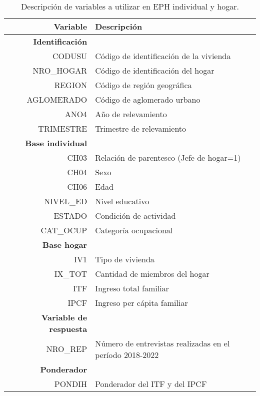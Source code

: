 \documentclass{article}
\begin{document}
\begin{table}
    \centering
\caption{Descripción de variables a utilizar en EPH individual y hogar.}

\

\label{tab:my_label}
    \begin{tabular}{|rl|} 
        \hline
        \textbf{Variable} & 
        \textbf{Descripción} \\ 
        \hline

        \textbf{Identificación}&\\
        CODUSU & Código de identificación de la vivienda\\
        NRO\_HOGAR & Código de identificación del hogar \\
        REGION&Código de región geográfica\\
        AGLOMERADO & Código de aglomerado urbano \\
        ANO4&Año de relevamiento\\
        TRIMESTRE&Trimestre de relevamiento\\
        
        \hline
        \textbf{Base individual}&\\
        CH03&Relación de parentesco (Jefe de hogar=1)\\
        CH04&Sexo\\
        CH06&Edad \\
        NIVEL\_ED&Nivel educativo\\
        ESTADO&Condición de actividad\\
        CAT\_OCUP&Categoría ocupacional\\
        
        \hline
        \textbf{Base hogar}&\\
        IV1&Tipo de vivienda\\
        IX\_TOT&Cantidad de miembros del hogar\\
        ITF&Ingreso total familiar\\
        IPCF&Ingreso per cápita familiar\\ 

        \hline
        \textbf{Variable de respuesta}&\\
        NRO\_REP&Número de entrevistas realizadas en el período 2018-2022\\ 
        
        \textbf{Ponderador}&\\
        PONDIH&Ponderador del ITF y del IPCF\\
        \hline
    \end{tabular}
    
    
\end{table}
\end{document}
